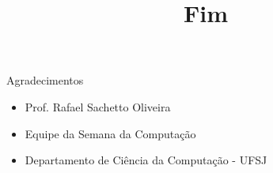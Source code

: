 \documentclass[12pt,t,graphics]{beamer}
\newcommand{\bi}{\begin{itemize}}
\newcommand{\ei}{\end{itemize}}
\begin{document}
\begin{frame}[t]{Agradecimentos}
	\bi
	\item Prof. Rafael Sachetto Oliveira
	\item Equipe da Semana da Computação
	\item Departamento de Ciência da Computação - UFSJ
	\ei
\end{frame}


\begin{frame}
	\title{Fim}
	\date{}\author{}\subtitle{}\institute{}\date{}
	\maketitle
\end{frame}

\end{document}
